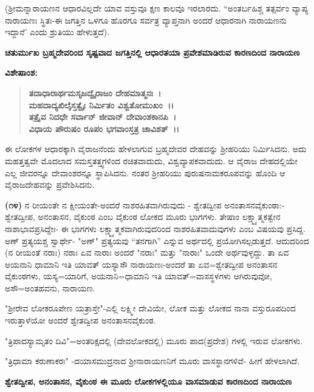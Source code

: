 (ಶ‍್ರೀಮನ್ನಾರಾಯಣನ ಆಧಾರವಿಲ್ಲದೇ ಯಾವ ವಸ್ತುವೂ ಕ್ಷಣ ಕಾಲವೂ ಇರಲಾರದು. “ಅಂತರ್ಬಹಿಶ್ಚ ತತ್ಸರ್ವಂ ವ್ಯಾಪ್ಯ ನಾರಾಯಣಃ ಸ್ಥಿತಃ-ಈ ಜಗತ್ತಿನ ಒಳಗೂ ಹೊರಗೂ ಸರ್ವತ್ರ ವ್ಯಾಪ್ತನಾಗಿ ಅಂದರೆ ಆಧಾರನಾಗಿ ನಾರಾಯಣನು ಇದ್ದಾನೆ' ಎಂದು ಶ್ರುತಿಯು ಹೇಳುತ್ತದೆ).

\begin{center}
\textbf{ಚತುರ್ಮುಖ ಬ್ರಹ್ಮದೇವರಿಂದ ಸೃಷ್ಟವಾದ ಜಗತ್ತಿನಲ್ಲಿ ಆಧಾರತಯಾ ಪ್ರವೇಶಮಾಡಿರುವ ಕಾರಣದಿಂದ ನಾರಾಯಣ}
\end{center}

\noindent
\textbf{ವಿಶೇಷಾಂಶ:\enginline{-}}

\begin{verse}
\textbf{ತದಾಧಾರಾರ್ಥಮಸೃಜದ್ವೈರಾಜಂ ದೇಹಮಾತ್ಮನಃ~।}\\\textbf{ಮಹದಾದ್ಯಖಿಲೈಸ್ತತ್ವೈಃ ನಿರ್ಮಿತಂ ವಿಶ್ವತೋಮುಖಂ~।।}\\\textbf{ತತ್ರೈವ ನಿದಧೇ ಸರ್ವಾನ್ ಜೀವಾನ್ ದೇವಾಂಶಕಾನಪಿ~।}\\\textbf{ವಿಧಾಯ ಪೌರುಷಂ ರೂಪಂ ಭಗವಾಂಸ್ತತ್ರ ಚಾವಿಶತ್~।।}
\end{verse}


\noindent
ಈ ಲೋಕಗಳ ಆಧಾರಕ್ಕಾಗಿ ವೈರಾಜನೆಂದು ಹೇಳಲಾಗುವ ಬ್ರಹ್ಮದೇವರ ದೇಹವನ್ನು ಶ‍್ರೀಹರಿಯು ನಿರ್ಮಿಸಿದನು. ಅದು ಮಹತ್ತತ್ವವೇ ಮೊದಲಾದ ಸಮಸ್ತತತ್ತ್ವಗಳಿಂದ ರಚಿತವಾದುದು, ವಿಶ್ವವ್ಯಾಪಕವಾದುದು. ಆ ವೈರಾಜ ದೇಹದಲ್ಲಿಯೇ ಎಲ್ಲ ಜೀವರನ್ನೂ ದೇವಾಂಶರನ್ನೂ ಸ್ಥಾಪಿಸಿದನು. ನಂತರ ಶ‍್ರೀಹರಿಯು ಪುರುಷನಾಮಕರೂಪವನ್ನು ಹೊಂದಿ ಆ ವೈರಾಜದೇಹವನ್ನು ಪ್ರವೇಶಿಸಿದನು.

\textbf{(೧೪)} ನ ರೀಯಂತೇ ನ ಕ್ಷೀಯಂತೇ-ಅಂದರೆ ನಾಶರಹಿತವಾಗಿರುವುದು - ಶ್ವೇತದ್ವೀಪ ಅನಂತಾಸನವೈಕುಂಠಾ:-ಶ್ವೇತದ್ವೀಪ, ಅನಂತಾಸನ, ವೈಕುಂಠ ಎಂಬ ವೈಕುಂಠ ಲೋಕದ ಮೂರು ಭಾಗಗಳು. ತೇಷಾಂ ಲಕ್ಷ್ಮ್ಯಾತ್ಮಕತ್ವೇನ ನಾಶಾಭಾವಪ್ರಸಿದ್ದೇಃ- ಈ ಭಾಗಗಳು ಲಕ್ಷ್ಮ್ಯಾತ್ಮಕವಾಗಿರುವುದರಿಂದ ನಾಶರಹಿತವಾದುವುಗಳು ಎಂಬ ವಿಷಯವು ಪ್ರಸಿದ್ದ. ಅಣ್ ಪ್ರತ್ಯಯಶ್ಚ ಸ್ವಾರ್ಥೇ- "ಅಣ್" ಪ್ರತ್ಯಯವು “ತನಗಾಗಿ'' ಎನ್ನುವ ಅರ್ಥದಲ್ಲಿ ಪ್ರಯೋಗಿಸಲ್ಪ\-ಡುತ್ತದೆ. ಆದುದರಿಂದ (ನ ರೀಯಂತೆ ನರಾಃ) ನರಾಃ ಏವ ನಾರಾಃ ಅಂದರೆ "ನರಾಃ" ಮತ್ತು "ನಾರಾಃ" ಒಂದೇ ಅರ್ಥವುಳ್ಳದ್ದು. ತಾ ಏವ ಅಯನಾನಿ ಧಾಮಾನಿ ಇತಿ ಯಾವತ್‌ ಯಸ್ಯಾಸೌ ನಾರಾಯಣಃ-ಅಂದರೆ ತಾ ಏವ=ಶ್ವೇತದ್ವೀಪ ಅನಂತಾಸನ ವೈಕುಂಠಗಳು, ಯಸ್ಯ=ಯಾರಿಗೆ, ಅಯನಾನಿ=ಧಾಮಾನಿ ಇತಿ ಯಾವತ್=ವಾಸಸ್ಥಳಗಳು ಆಗಿರುವುವೋ, ಅಸೌ=ಅಂತಹವನು, ನಾರಾಯಣ.

"ಶ‍್ರೀರೇವ ಲೋಕರೂಪೇಣ ಯತ್ರಾಸ್ತೇ"-ಎಲ್ಲಿ ಲಕ್ಷ್ಮೀ ದೇವಿಯೇ, ಲೋಕ ಮತ್ತು ಲೋಕದ ನಾನಾ ವಸ್ತುರೂಪದಿಂದ ಇರುತ್ತಾಳೆಯೋ ಅಂದರೆ ಶ್ವೇತದ್ವೀಪ ಅನಂತಾಸನವೈಕುಂಠ.

"ತ್ರಿಪಾದಸ್ಯಾಮೃತಂ ದಿವಿ"=ಅಂತರಿಕ್ಷದಲ್ಲಿ (ದೇವಲೋಕದಲ್ಲಿ) ಮೂರು ಪಾದ\break (ಪ್ರದೇಶ) ಗಳಲ್ಲಿ ಇರುವ ಲೋಕಗಳು.

"ತ್ರಿಧಾಮಾ ಕರುಣಾಕರಃ" -ದಯಾಸಮುದ್ರನಾದ ಶ‍್ರೀನಾರಾಯಣನಿಗೆ ಮೂರು ವಾಸಸ್ಥಾನಗಳಿವೆ- ಹೀಗೆ ಹೇಳಲಾಗಿದೆ.

\begin{center}
\textbf{ಶ್ವೇತದ್ವೀಪ, ಅನಂತಾಸನ, ವೈಕುಂಠ ಈ ಮೂರು ಲೋಕಗಳಲ್ಲಿಯೂ ವಾಸಮಾಡುವ ಕಾರಣದಿಂದ ನಾರಾಯಣ}
\end{center}

